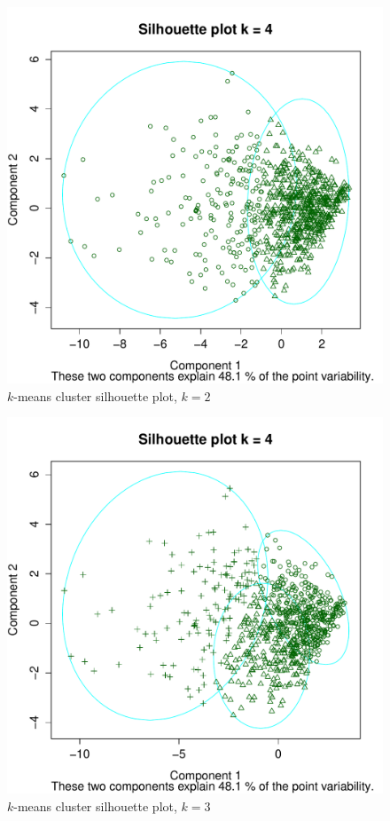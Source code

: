 \documentclass[letterpaper,12pt]{article}
\begin{document}
\begin{figure}[h]
  \centering
  \includegraphics[width=\linewidth]{kmeans-silhouette-2.pdf}
  \caption{$k$-means cluster silhouette plot, $k = 2$}
  \label{fig:kmeans-silhouette-2}
\end{figure}

\begin{figure}[h]
  \centering
  \includegraphics[width=\linewidth]{kmeans-silhouette-3.pdf}
  \caption{$k$-means cluster silhouette plot, $k = 3$}
  \label{fig:kmeans-silhouette-3}
\end{figure}
\end{document}
